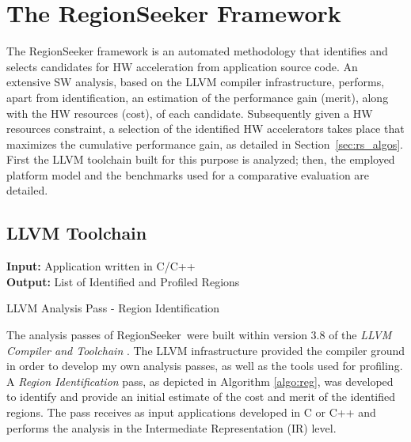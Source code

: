 \documentclass[]{usiinfthesis}
\newcommand{\rseeker}{{RegionSeeker}}
\begin{document}
\section{The RegionSeeker Framework}
\label{sec:rs}

The RegionSeeker framework is an automated methodology that 
identifies and selects candidates for HW acceleration from application source 
code. An extensive SW analysis, based on the LLVM compiler infrastructure,
performs, apart from identification, an estimation of the performance gain (merit), along with
the HW resources (cost), of each candidate. Subsequently given a HW resources
constraint, a selection of the identified HW accelerators takes place that
maximizes the cumulative performance gain, as detailed in Section~\ref{sec:rs_algos}.
First the LLVM toolchain built for this purpose is analyzed; then, the employed 
platform model and the benchmarks used for a comparative evaluation are detailed.

\subsection{LLVM Toolchain}

\begin{algorithm}[t]
\begin{flushleft}
\textbf{Input:}  Application written in C/C++\\
\textbf{Output:} List of Identified and Profiled Regions\\
\end{flushleft}
\begin{algorithmic}[1]
\State{}
\State{}
      \State{}
    \EndIf
  \EndFor

\EndFunction
\State
{}
    \State{}
  \EndFor
\EndFunction
\end{algorithmic}
\caption{LLVM Analysis Pass - Region Identification} 
\label{algo:reg}
\end{algorithm}

The analysis passes of \rseeker\ were built within version 3.8 of the \emph{LLVM
  Compiler and Toolchain} \cite{LattnerMar04}. The LLVM infrastructure
provided the compiler ground in order to develop my own analysis
passes, as well as the tools used for profiling. 
A \emph{Region Identification} pass, as depicted in Algorithm \ref{algo:reg}, 
was developed to identify and provide an initial estimate of the cost and merit of 
the identified regions. The pass receives as input applications developed
in C or C++ and performs the analysis in the Intermediate Representation
(IR) level. \par
\end{document}
